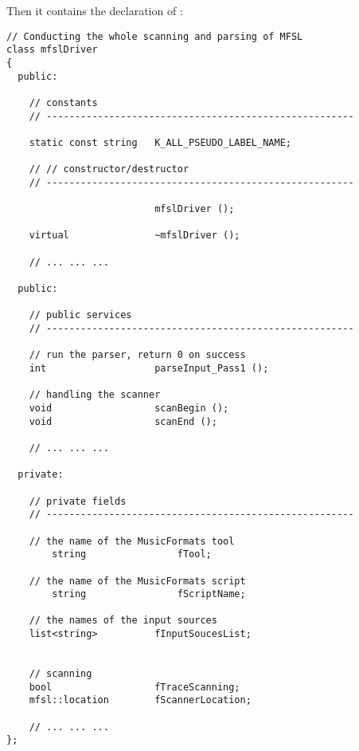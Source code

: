 Then it contains the declaration of :
\begin{lstlisting}[language=CPlusPlus]
// Conducting the whole scanning and parsing of MFSL
class mfslDriver
{
  public:

    // constants
    // ------------------------------------------------------

    static const string   K_ALL_PSEUDO_LABEL_NAME;

    // // constructor/destructor
    // ------------------------------------------------------

                          mfslDriver ();

    virtual               ~mfslDriver ();

	// ... ... ...

  public:

    // public services
    // ------------------------------------------------------

    // run the parser, return 0 on success
    int                   parseInput_Pass1 ();

    // handling the scanner
    void                  scanBegin ();
    void                  scanEnd ();

	// ... ... ...

  private:

    // private fields
    // ------------------------------------------------------

    // the name of the MusicFormats tool
		string                fTool;

    // the name of the MusicFormats script
		string                fScriptName;

    // the names of the input sources
    list<string>          fInputSoucesList;


    // scanning
    bool                  fTraceScanning;
    mfsl::location        fScannerLocation;

	// ... ... ...
};
\end{lstlisting}

